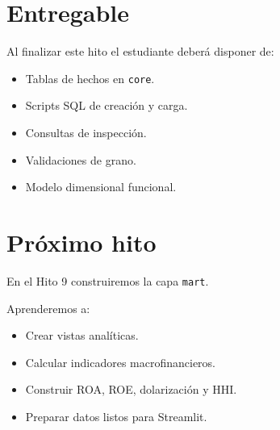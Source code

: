 \section{Entregable}

Al finalizar este hito el estudiante deberá disponer de:

\begin{itemize}
\item Tablas de hechos en \texttt{core}.
\item Scripts SQL de creación y carga.
\item Consultas de inspección.
\item Validaciones de grano.
\item Modelo dimensional funcional.
\end{itemize}

\section{Próximo hito}

En el Hito 9 construiremos la capa \texttt{mart}.

Aprenderemos a:

\begin{itemize}
\item Crear vistas analíticas.
\item Calcular indicadores macrofinancieros.
\item Construir ROA, ROE, dolarización y HHI.
\item Preparar datos listos para Streamlit.
\end{itemize}
